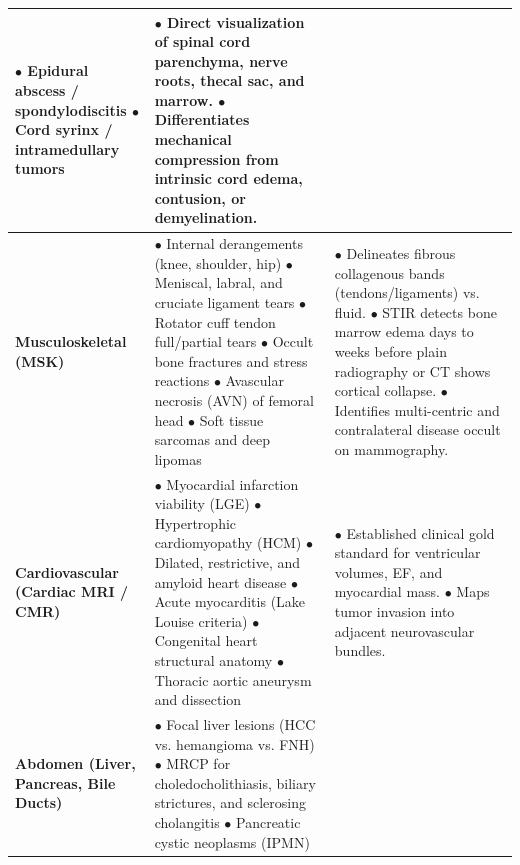 \documentclass[11pt,a4paper]{article}
\begin{document}
\begin{longtable}{p{3.2cm}p{6cm}p{6cm}}
$\bullet$ Epidural abscess / spondylodiscitis\newline
$\bullet$ Cord syrinx / intramedullary tumors & 
$\bullet$ Direct visualization of spinal cord parenchyma, nerve roots, thecal sac, and marrow.\newline
$\bullet$ Differentiates mechanical compression from intrinsic cord edema, contusion, or demyelination. \\
\midrule
\textbf{Musculoskeletal (MSK)} & 
$\bullet$ Internal derangements (knee, shoulder, hip)\newline
$\bullet$ Meniscal, labral, and cruciate ligament tears\newline
$\bullet$ Rotator cuff tendon full/partial tears\newline
$\bullet$ Occult bone fractures and stress reactions\newline
$\bullet$ Avascular necrosis (AVN) of femoral head\newline
$\bullet$ Soft tissue sarcomas and deep lipomas & 
$\bullet$ Delineates fibrous collagenous bands (tendons/ligaments) vs. fluid.\newline
$\bullet$ STIR detects bone marrow edema days to weeks before plain radiography or CT shows cortical collapse.\newline
$\bullet$ Identifies multi-centric and contralateral disease occult on mammography. \\
\midrule
\textbf{Cardiovascular (Cardiac MRI / CMR)} & 
$\bullet$ Myocardial infarction viability (LGE)\newline
$\bullet$ Hypertrophic cardiomyopathy (HCM)\newline
$\bullet$ Dilated, restrictive, and amyloid heart disease\newline
$\bullet$ Acute myocarditis (Lake Louise criteria)\newline
$\bullet$ Congenital heart structural anatomy\newline
$\bullet$ Thoracic aortic aneurysm and dissection & 
$\bullet$ Established clinical gold standard for ventricular volumes, EF, and myocardial mass.\newline
$\bullet$ Maps tumor invasion into adjacent neurovascular bundles. \\
\midrule
\textbf{Abdomen (Liver, Pancreas, Bile Ducts)} & 
$\bullet$ Focal liver lesions (HCC vs. hemangioma vs. FNH)\newline
$\bullet$ MRCP for choledocholithiasis, biliary strictures, and sclerosing cholangitis\newline
$\bullet$ Pancreatic cystic neoplasms (IPMN)\newline

\end{longtable}
\end{document}
